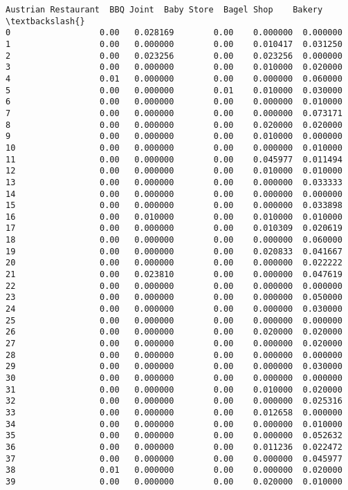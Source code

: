 \documentclass[11pt]{article}
\begin{document}
\begin{tcolorbox}[breakable, size=fbox, boxrule=.5pt, pad at break*=1mm, opacityfill=0]
\begin{Verbatim}[commandchars=\\\{\}]
    Austrian Restaurant  BBQ Joint  Baby Store  Bagel Shop    Bakery  \textbackslash{}
0                  0.00   0.028169        0.00    0.000000  0.000000
1                  0.00   0.000000        0.00    0.010417  0.031250
2                  0.00   0.023256        0.00    0.023256  0.000000
3                  0.00   0.000000        0.00    0.010000  0.020000
4                  0.01   0.000000        0.00    0.000000  0.060000
5                  0.00   0.000000        0.01    0.010000  0.030000
6                  0.00   0.000000        0.00    0.000000  0.010000
7                  0.00   0.000000        0.00    0.000000  0.073171
8                  0.00   0.000000        0.00    0.020000  0.020000
9                  0.00   0.000000        0.00    0.010000  0.000000
10                 0.00   0.000000        0.00    0.000000  0.010000
11                 0.00   0.000000        0.00    0.045977  0.011494
12                 0.00   0.000000        0.00    0.010000  0.010000
13                 0.00   0.000000        0.00    0.000000  0.033333
14                 0.00   0.000000        0.00    0.000000  0.000000
15                 0.00   0.000000        0.00    0.000000  0.033898
16                 0.00   0.010000        0.00    0.010000  0.010000
17                 0.00   0.000000        0.00    0.010309  0.020619
18                 0.00   0.000000        0.00    0.000000  0.060000
19                 0.00   0.000000        0.00    0.020833  0.041667
20                 0.00   0.000000        0.00    0.000000  0.022222
21                 0.00   0.023810        0.00    0.000000  0.047619
22                 0.00   0.000000        0.00    0.000000  0.000000
23                 0.00   0.000000        0.00    0.000000  0.050000
24                 0.00   0.000000        0.00    0.000000  0.030000
25                 0.00   0.000000        0.00    0.000000  0.000000
26                 0.00   0.000000        0.00    0.020000  0.020000
27                 0.00   0.000000        0.00    0.000000  0.020000
28                 0.00   0.000000        0.00    0.000000  0.000000
29                 0.00   0.000000        0.00    0.000000  0.030000
30                 0.00   0.000000        0.00    0.000000  0.000000
31                 0.00   0.000000        0.00    0.010000  0.020000
32                 0.00   0.000000        0.00    0.000000  0.025316
33                 0.00   0.000000        0.00    0.012658  0.000000
34                 0.00   0.000000        0.00    0.000000  0.010000
35                 0.00   0.000000        0.00    0.000000  0.052632
36                 0.00   0.000000        0.00    0.011236  0.022472
37                 0.00   0.000000        0.00    0.000000  0.045977
38                 0.01   0.000000        0.00    0.000000  0.020000
39                 0.00   0.000000        0.00    0.020000  0.010000


\end{Verbatim}
\end{tcolorbox}
\end{document}
